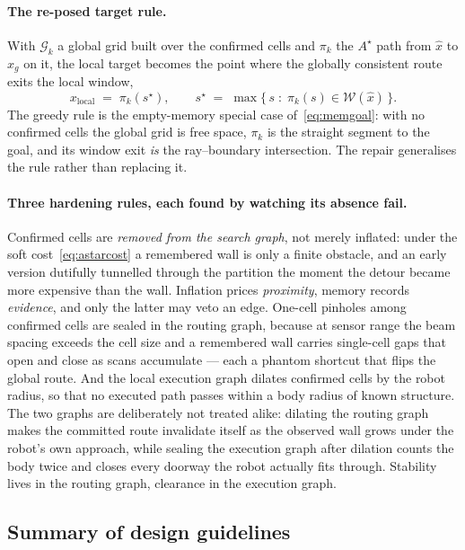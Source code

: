 \documentclass[11pt,a4paper]{article}
\newcommand{\astar}{$A^\star$}
\begin{document}
\paragraph{The re-posed target rule.} With $\mathcal{G}_k$ a global grid built over the confirmed cells and
$\pi_k$ the \astar{} path from $\hat x$ to $x_g$ on it, the local target becomes the point where the globally
consistent route exits the local window,
\begin{equation}
  x_{\mathrm{local}} \;=\; \pi_k(s^\star),
  \qquad
  s^\star \;=\; \max\{\,s \;:\; \pi_k(s)\in\mathcal{W}(\hat x)\,\}.
  \label{eq:memgoal}
\end{equation}
The greedy rule is the empty-memory special case of~\eqref{eq:memgoal}: with no confirmed cells the global
grid is free space, $\pi_k$ is the straight segment to the goal, and its window exit \emph{is} the
ray--boundary intersection. The repair generalises the rule rather than replacing it.

\paragraph{Three hardening rules, each found by watching its absence fail.} Confirmed cells are
\emph{removed from the search graph}, not merely inflated: under the soft cost~\eqref{eq:astarcost} a
remembered wall is only a finite obstacle, and an early version dutifully tunnelled through the partition the
moment the detour became more expensive than the wall. Inflation prices \emph{proximity}, memory records
\emph{evidence}, and only the latter may veto an edge. One-cell pinholes among confirmed cells are sealed in
the routing graph, because at sensor range the beam spacing exceeds the cell size and a remembered wall
carries single-cell gaps that open and close as scans accumulate --- each a phantom shortcut that flips the
global route. And the local execution graph dilates confirmed cells by the robot radius, so that no executed
path passes within a body radius of known structure. The two graphs are deliberately not treated alike:
dilating the routing graph makes the committed route invalidate itself as the observed wall grows under the
robot's own approach, while sealing the execution graph after dilation counts the body twice and closes every
doorway the robot actually fits through. Stability lives in the routing graph, clearance in the execution
graph.

\subsection{Summary of design guidelines}
\label{sec:guidelines}
\end{document}
